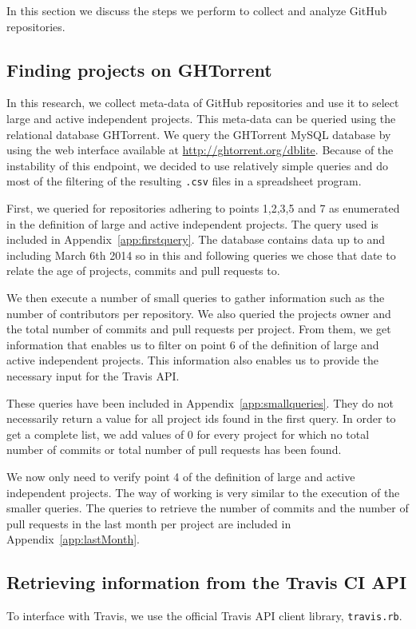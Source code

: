 In this section we discuss the steps we perform to collect and analyze GitHub repositories.

\subsection{Finding projects on GHTorrent}
In this research, we collect meta-data of GitHub repositories and use it to select large and active independent projects.
This meta-data can be queried using the relational database GHTorrent. \cite{ghtorrent}
We query the GHTorrent MySQL database by using the web interface available at \url{http://ghtorrent.org/dblite}. 
Because of the instability of this endpoint, we decided to use relatively simple queries and do most of the filtering of the resulting \texttt{.csv} files in a spreadsheet program.

First, we queried for repositories adhering to points 1,2,3,5 and 7 as enumerated in the definition of large and active independent projects.
The query used is included in Appendix~\ref{app:firstquery}.
The database contains data up to and including March 6th 2014 so in this and following queries we chose that date to relate the age of projects, commits and pull requests to.

We then execute a number of small queries to gather information such as the number of contributors per repository. 
We also queried the projects owner and the total number of commits and pull requests per project. 
From them, we get information that enables us to filter on point 6 of the definition of large and active independent projects. 
This information also enables us to provide the necessary input for the Travis API.

These queries have been included in Appendix~\ref{app:smallqueries}.
They do not necessarily return a value for all project ids found in the first query.
In order to get a complete list, we add values of 0 for every project for which no total number of commits or total number of pull requests has been found.

We now only need to verify point 4 of the definition of large and active independent projects. 
The way of working is very similar to the execution of the smaller queries. 
The queries to retrieve the number of commits and the number of pull requests in the last month per project are included in Appendix~\ref{app:lastMonth}.

\subsection{Retrieving information from the Travis CI API}
To interface with Travis, we use the official Travis API client library, \texttt{travis.rb}.


